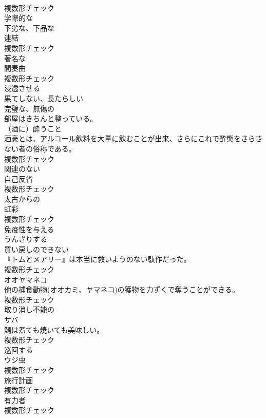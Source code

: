 \documentclass[8pt]{extreport}
\begin{document}
\begin{CJK}{UTF8}{min}
\\	複数形チェック
\\	[形容詞]	学際的な	
\\	[形容詞]	下劣な、下品な	
\\	[名詞]	連結	
\\	複数形チェック
\\	[形容詞]	著名な	
\\	[名詞]	間奏曲	
\\	複数形チェック
\\	[動詞]	浸透させる	
\\	[形容詞]	果てしない、⻑たらしい	
\\	[形容詞]	完璧な、無傷の	
\\	部屋はきちんと整っている。	
\\	[名詞]	（酒に）酔うこと	
\\	酒豪とは、アルコール飲料を大量に飲むことが出来、さらにこれで酔態をさらさない者の俗称である。	
\\	複数形チェック
\\	[形容詞]	関連のない	
\\	[名詞]	自己反省	
\\	複数形チェック
\\	[形容詞]	太古からの	
\\	[名詞]	虹彩	
\\	複数形チェック
\\	[動詞]	免疫性を与える	
\\	[形容詞]	うんざりする	
\\	[名詞]	買い戻しのできない	
\\	『トムとメアリー』は本当に救いようのない駄作だった。	
\\	複数形チェック
\\	[名詞]	オオヤマネコ	
\\	他の捕食動物(オオカミ、ヤマネコ)の獲物を力ずくで奪うことができる。	
\\	複数形チェック
\\	[形容詞]	取り消し不能の	
\\	[名詞]	サバ	
\\	鯖は煮ても焼いても美味しい。	
\\	複数形チェック
\\	[形容詞]	巡回する	
\\	[名詞]	ウジ虫	
\\	複数形チェック
\\	[名詞]	旅行計画	
\\	複数形チェック
\\	[名詞]	有力者	
\\	複数形チェック

\end{CJK}
\end{document}

